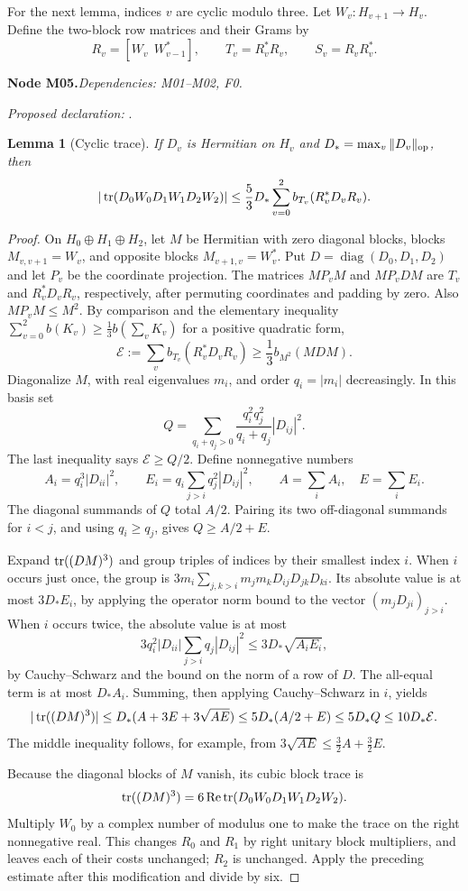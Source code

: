 \documentclass[11pt]{article}
\newtheorem{lemma}[theorem]{Lemma}
\theoremstyle{remark}\newtheorem{remark}[theorem]{Remark}
\newcommand{\bpnode}[3]{\par\Needspace{5\baselineskip}\noindent\textbf{Node #1.}\quad\textit{Dependencies: #2.}\par\noindent\textit{Proposed declaration:} \texttt{\detokenize{#3}}.\par\smallskip}
\begin{document}
For the next lemma, indices $v$ are cyclic modulo three. Let $W_v:H_{v+1}\to H_v$. Define the two-block row matrices and their Grams by
\[
 R_v=[W_v\ \ W_{v-1}^*],\qquad T_v=R_v^*R_v,\qquad S_v=R_vR_v^*.
\]
\bpnode{M05}{M01--M02, F0}{cyclic_trace_control}
\begin{lemma}[Cyclic trace]\label{lem:trace}
If $D_v$ is Hermitian on $H_v$ and $D_* =\max_v\|D_v\|_{\mathrm{op}}$, then
\[
 |\operatorname{tr}(D_0W_0D_1W_1D_2W_2)|
 \leq\frac53D_*\sum_{v=0}^2b_{T_v}(R_v^*D_vR_v).
\]
\end{lemma}
\begin{proof}
On $H_0\oplus H_1\oplus H_2$, let $M$ be Hermitian with zero diagonal blocks, blocks $M_{v,v+1}=W_v$, and opposite blocks $M_{v+1,v}=W_v^*$. Put $D=\operatorname{diag}(D_0,D_1,D_2)$ and let $P_v$ be the coordinate projection. The matrices $MP_vM$ and $MP_vDM$ are $T_v$ and $R_v^*D_vR_v$, respectively, after permuting coordinates and padding by zero. Also $MP_vM\leq M^2$. By comparison and the elementary inequality $\sum_{v=0}^2b(K_v)\geq\frac13b(\sum_vK_v)$ for a positive quadratic form,
\[
 \mathcal E:=\sum_vb_{T_v}(R_v^*D_vR_v)\geq\frac13b_{M^2}(MDM).
\]
Diagonalize $M$, with real eigenvalues $m_i$, and order $q_i=|m_i|$ decreasingly. In this basis set
\[
 Q=\sum_{q_i+q_j>0}\frac{q_i^2q_j^2}{q_i+q_j}|D_{ij}|^2.
\]
The last inequality says $\mathcal E\geq Q/2$. Define nonnegative numbers
\[
 A_i=q_i^3|D_{ii}|^2,\qquad E_i=q_i\sum_{j>i}q_j^2|D_{ij}|^2,
 \qquad A=\sum_iA_i,\quad E=\sum_iE_i.
\]
The diagonal summands of $Q$ total $A/2$. Pairing its two off-diagonal summands for $i<j$, and using $q_i\geq q_j$, gives $Q\geq A/2+E$.

Expand $\operatorname{tr}((DM)^3)$ and group triples of indices by their smallest index $i$. When $i$ occurs just once, the group is
$3m_i\sum_{j,k>i}m_jm_kD_{ij}D_{jk}D_{ki}$. Its absolute value is at most $3D_*E_i$, by applying the operator norm bound to the vector $(m_jD_{ji})_{j>i}$. When $i$ occurs twice, the absolute value is at most
\[
 3q_i^2|D_{ii}|\sum_{j>i}q_j|D_{ij}|^2
 \leq3D_*\sqrt{A_iE_i},
\]
by Cauchy--Schwarz and the bound on the norm of a row of $D$. The all-equal term is at most $D_*A_i$. Summing, then applying Cauchy--Schwarz in $i$, yields
\[
 |\operatorname{tr}((DM)^3)|\leq D_*(A+3E+3\sqrt{AE})
 \leq5D_*(A/2+E)\leq5D_*Q\leq10D_*\mathcal E.
\]
The middle inequality follows, for example, from $3\sqrt{AE}\leq\frac32A+\frac32E$.

Because the diagonal blocks of $M$ vanish, its cubic block trace is
\[
 \operatorname{tr}((DM)^3)=6\operatorname{Re}\operatorname{tr}(D_0W_0D_1W_1D_2W_2).
\]
Multiply $W_0$ by a complex number of modulus one to make the trace on the right nonnegative real. This changes $R_0$ and $R_1$ by right unitary block multipliers, and leaves each of their costs unchanged; $R_2$ is unchanged. Apply the preceding estimate after this modification and divide by six.
\end{proof}
\end{document}
